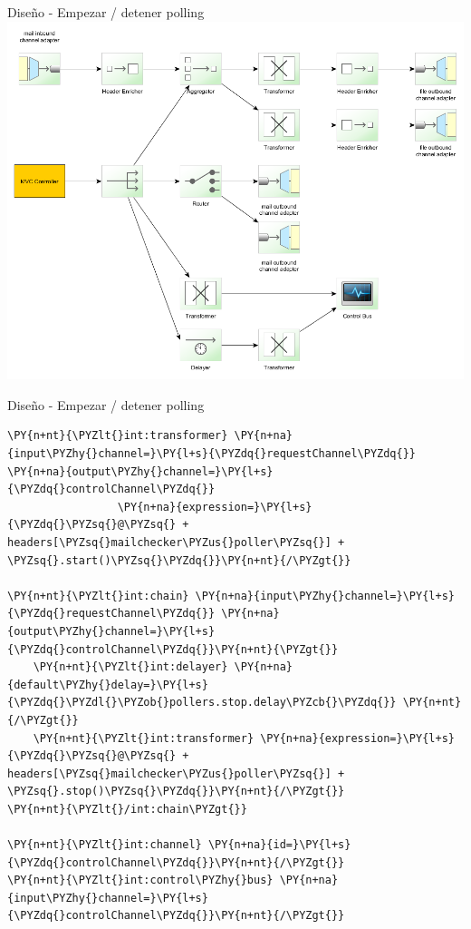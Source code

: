 \documentclass{beamer}
\begin{document}
\begin{frame}{Diseño - Empezar / detener polling}
\includegraphics[width=0.8\linewidth]{sp-int-14a}
\end{frame}

\begin{frame}[fragile]{Diseño - Empezar / detener polling}
\begin{Verbatim}[fontsize=\tiny,commandchars=\\\{\}]
\PY{n+nt}{\PYZlt{}int:transformer} \PY{n+na}{input\PYZhy{}channel=}\PY{l+s}{\PYZdq{}requestChannel\PYZdq{}} \PY{n+na}{output\PYZhy{}channel=}\PY{l+s}{\PYZdq{}controlChannel\PYZdq{}}
                 \PY{n+na}{expression=}\PY{l+s}{\PYZdq{}\PYZsq{}@\PYZsq{} + headers[\PYZsq{}mailchecker\PYZus{}poller\PYZsq{}] + \PYZsq{}.start()\PYZsq{}\PYZdq{}}\PY{n+nt}{/\PYZgt{}}

\PY{n+nt}{\PYZlt{}int:chain} \PY{n+na}{input\PYZhy{}channel=}\PY{l+s}{\PYZdq{}requestChannel\PYZdq{}} \PY{n+na}{output\PYZhy{}channel=}\PY{l+s}{\PYZdq{}controlChannel\PYZdq{}}\PY{n+nt}{\PYZgt{}}
    \PY{n+nt}{\PYZlt{}int:delayer} \PY{n+na}{default\PYZhy{}delay=}\PY{l+s}{\PYZdq{}\PYZdl{}\PYZob{}pollers.stop.delay\PYZcb{}\PYZdq{}} \PY{n+nt}{/\PYZgt{}}
    \PY{n+nt}{\PYZlt{}int:transformer} \PY{n+na}{expression=}\PY{l+s}{\PYZdq{}\PYZsq{}@\PYZsq{} + headers[\PYZsq{}mailchecker\PYZus{}poller\PYZsq{}] + \PYZsq{}.stop()\PYZsq{}\PYZdq{}}\PY{n+nt}{/\PYZgt{}}
\PY{n+nt}{\PYZlt{}/int:chain\PYZgt{}}

\PY{n+nt}{\PYZlt{}int:channel} \PY{n+na}{id=}\PY{l+s}{\PYZdq{}controlChannel\PYZdq{}}\PY{n+nt}{/\PYZgt{}}
\PY{n+nt}{\PYZlt{}int:control\PYZhy{}bus} \PY{n+na}{input\PYZhy{}channel=}\PY{l+s}{\PYZdq{}controlChannel\PYZdq{}}\PY{n+nt}{/\PYZgt{}}
\end{Verbatim}
\end{frame}
\end{document}
